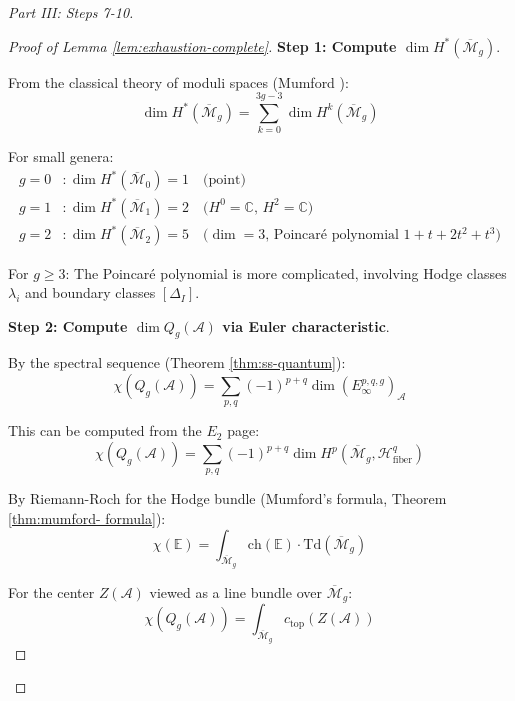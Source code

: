 \begin{proof}[Part III: Steps 7-10]
\begin{proof}[Proof of Lemma \ref{lem:exhaustion-complete}]
\textbf{Step 1: Compute $\dim H^*(\overline{\mathcal{M}}_g)$}.

From the classical theory of moduli spaces (Mumford \cite{Mumford83}):
\begin{equation}
\dim H^*(\overline{\mathcal{M}}_g) = \sum_{k=0}^{3g-3} \dim H^k(\overline{\mathcal{M}}_g)
\end{equation}

For small genera:
\begin{align}
g=0&: \dim H^*(\overline{\mathcal{M}}_0) = 1 \quad \text{(point)}\\
g=1&: \dim H^*(\overline{\mathcal{M}}_1) = 2 \quad \text{($H^0 = \mathbb{C}$, 
$H^2 = \mathbb{C}$)}\\
g=2&: \dim H^*(\overline{\mathcal{M}}_2) = 5 \quad \text{($\dim = 3$, Poincaré 
polynomial $1 + t + 2t^2 + t^3$)}
\end{align}

For $g \geq 3$: The Poincaré polynomial is more complicated, involving Hodge classes 
$\lambda_i$ and boundary classes $[\Delta_I]$.

\textbf{Step 2: Compute $\dim Q_g(\mathcal{A})$ via Euler characteristic}.

By the spectral sequence (Theorem \ref{thm:ss-quantum}):
\begin{equation}
\chi(Q_g(\mathcal{A})) = \sum_{p,q} (-1)^{p+q} \dim (E_\infty^{p,q,g})_{\mathcal{A}}
\end{equation}

This can be computed from the $E_2$ page:
\begin{equation}
\chi(Q_g(\mathcal{A})) = \sum_{p,q} (-1)^{p+q} \dim H^p(\overline{\mathcal{M}}_g, 
\mathcal{H}^q_{\text{fiber}})
\end{equation}

By Riemann-Roch for the Hodge bundle (Mumford's formula, Theorem \ref{thm:mumford-
formula}):
\begin{equation}
\chi(\mathbb{E}) = \int_{\overline{\mathcal{M}}_g} \text{ch}(\mathbb{E}) \cdot 
\text{Td}(\overline{\mathcal{M}}_g)
\end{equation}

For the center $Z(\mathcal{A})$ viewed as a line bundle over $\overline{\mathcal{M}}_g$:
\begin{equation}
\chi(Q_g(\mathcal{A})) = \int_{\overline{\mathcal{M}}_g} c_{\text{top}}(Z(\mathcal{A}))
\end{equation}


\end{proof}
\end{proof}
